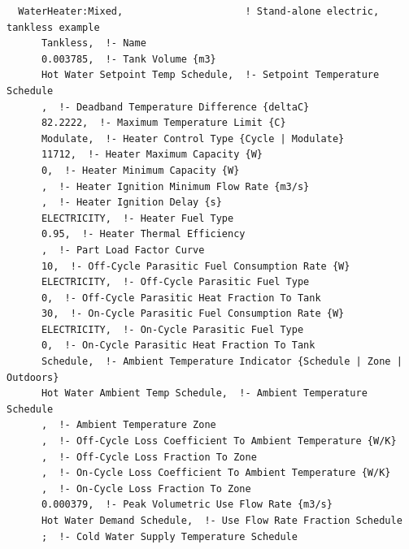 \begin{lstlisting}
  WaterHeater:Mixed,                     ! Stand-alone electric, tankless example
      Tankless,  !- Name
      0.003785,  !- Tank Volume {m3}
      Hot Water Setpoint Temp Schedule,  !- Setpoint Temperature Schedule
      ,  !- Deadband Temperature Difference {deltaC}
      82.2222,  !- Maximum Temperature Limit {C}
      Modulate,  !- Heater Control Type {Cycle | Modulate}
      11712,  !- Heater Maximum Capacity {W}
      0,  !- Heater Minimum Capacity {W}
      ,  !- Heater Ignition Minimum Flow Rate {m3/s}
      ,  !- Heater Ignition Delay {s}
      ELECTRICITY,  !- Heater Fuel Type
      0.95,  !- Heater Thermal Efficiency
      ,  !- Part Load Factor Curve
      10,  !- Off-Cycle Parasitic Fuel Consumption Rate {W}
      ELECTRICITY,  !- Off-Cycle Parasitic Fuel Type
      0,  !- Off-Cycle Parasitic Heat Fraction To Tank
      30,  !- On-Cycle Parasitic Fuel Consumption Rate {W}
      ELECTRICITY,  !- On-Cycle Parasitic Fuel Type
      0,  !- On-Cycle Parasitic Heat Fraction To Tank
      Schedule,  !- Ambient Temperature Indicator {Schedule | Zone | Outdoors}
      Hot Water Ambient Temp Schedule,  !- Ambient Temperature Schedule
      ,  !- Ambient Temperature Zone
      ,  !- Off-Cycle Loss Coefficient To Ambient Temperature {W/K}
      ,  !- Off-Cycle Loss Fraction To Zone
      ,  !- On-Cycle Loss Coefficient To Ambient Temperature {W/K}
      ,  !- On-Cycle Loss Fraction To Zone
      0.000379,  !- Peak Volumetric Use Flow Rate {m3/s}
      Hot Water Demand Schedule,  !- Use Flow Rate Fraction Schedule
      ;  !- Cold Water Supply Temperature Schedule



\end{lstlisting}
